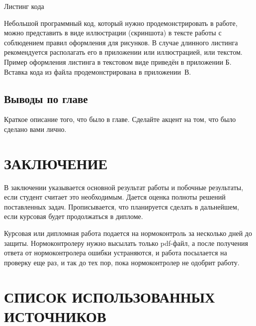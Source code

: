 \documentclass{report}
\begin{document}
Листинг кода

Небольшой программный код, который нужно продемонстрировать в работе, можно представить в виде иллюстрации (скриншота) в тексте работы с соблюдением правил оформления для рисунков. В случае длинного листинга рекомендуется располагать его в приложении или иллюстрацией, или текстом. Пример оформления листинга в текстовом виде приведён в приложении Б. Вставка кода из файла продемонстрирована в приложении~В.



\section*{Выводы по главе}
Краткое описание того, что было в главе. Сделайте акцент на том, что было сделано вами лично.

\chapter*{ЗАКЛЮЧЕНИЕ}

В заключении указывается основной результат работы и побочные результаты, если студент считает это необходимым. Дается оценка полноты решений поставленных задач. Прописывается, что планируется сделать в дальнейшем, если курсовая будет продолжаться в дипломе. 

Курсовая или дипломная работа подается на нормоконтроль за нес\-колько дней до защиты. Нормоконтролеру нужно высылать только pdf-файл, а после получения ответа от нормоконтролера ошибки устраняются, и работа посылается на проверку еще раз, и так до тех пор, пока нормоконтролер не одобрит работу.




\chapter*{СПИСОК ИСПОЛЬЗОВАННЫХ ИСТОЧНИКОВ}
\end{document}
